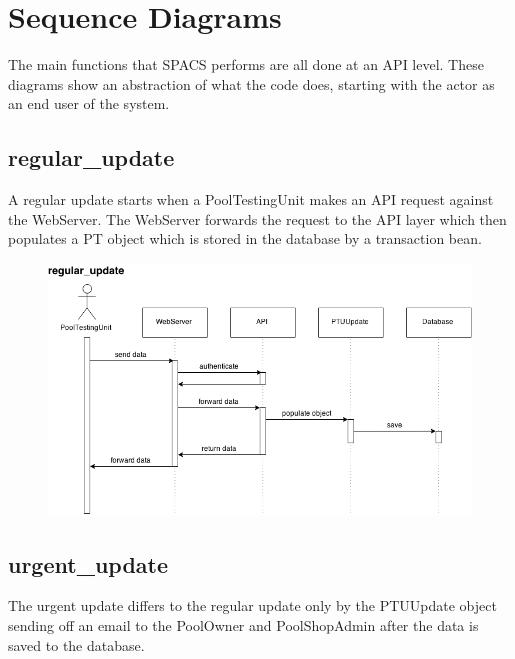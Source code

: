 \section{Sequence Diagrams}

\par
The main functions that SPACS performs are all done at an API level. These diagrams show an abstraction of what the code does, starting with the actor as an end user of the system.

\subsection{regular\_update}
\par
A regular update starts when a PoolTestingUnit makes an API request against the WebServer. The WebServer forwards the request to the API layer which then populates a PT object which is stored in the database by a transaction bean.

\begin{figure}[!ht]
\begin{center}
	\includegraphics[width=14cm]{images/regular_update}
\end{center}
\end{figure}
\FloatBarrier

\subsection{urgent\_update}
\par
The urgent update differs to the regular update only by the PTUUpdate object sending off an email to the PoolOwner and PoolShopAdmin after the data is saved to the database.


